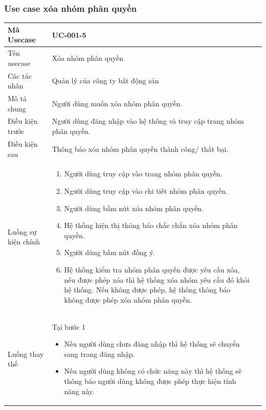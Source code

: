 \documentclass[12pt,a4paper]{article}
\begin{document}
    \subsubsection*{Use case xóa nhóm phân quyền }
    \begin{table}[H]
        \centering
        \begin{tabular}{|p{3.5cm}|p{11.5cm}|c|}
            \hline
            Mã Usecase      & UC-001-5                                                             \\
            \hline
            Tên usecase     & Xóa nhóm phân quyền                                                  \\
            \hline
            Các tác nhân    & Quản lý của công ty bất động sản                                     \\
            \hline
            Mô tả chung     & Người dùng muốn xóa nhóm phân quyền.                                 \\
            \hline
            Điều kiện trước & Người dùng đăng nhập vào hệ thống và truy cập trang nhóm phân quyền. \\
            \hline
            Điều kiện sau   & Thông báo xóa nhóm phân quyền thành công/ thất bại.                  \\
            \hline
            Luồng sự kiện chính & \vspace{-.8cm}\begin{enumerate}
                                                    \item Người dùng truy cập vào trang nhóm phân quyền.
                                                    \item Người dùng truy cập vào chi tiết nhóm phân quyền.
                                                    \item  Người dùng bấm nút xóa nhóm phân quyền.
                                                    \item  Hệ thống hiện thị thông báo chắc chắn xóa nhóm phân quyền.
                                                    \item  Người dùng bấm nút đồng ý.
                                                    \item Hệ thống kiểm tra nhóm phân quyền được yêu cầu xóa, nếu được phép xóa thì hệ thống xóa nhóm yêu cầu đó khỏi hệ thống. Nếu không được phép, hệ thống thông báo không được phép xóa nhóm phân quyền.
            \end{enumerate}
            \\
            \hline
            Luồng thay thế & Tại bước 1\newline
            \vspace{-.8cm}\begin{itemize}
                              \item Nếu người dùng chưa đăng nhập thì hệ thống sẽ chuyển sang trang đăng nhập.
                              \item Nếu người dùng không có chức năng này thì hệ thống sẽ thông báo người dùng không được phép thực hiện tính năng này.
            \end{itemize}


\end{tabular}
\end{table}
\end{document}
